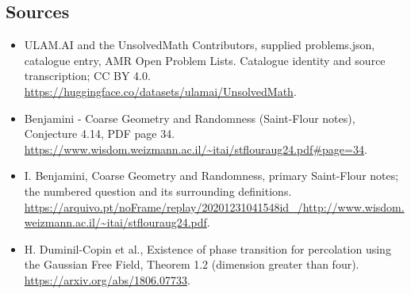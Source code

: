 \documentclass[11pt,a4paper]{article}
\begin{document}
\subsection{Sources}
\begin{itemize}
\item[S1] ULAM.AI and the UnsolvedMath Contributors, supplied problems.json, catalogue entry, AMR Open Problem Lists. Catalogue identity and source transcription; CC BY 4.0.
\url{https://huggingface.co/datasets/ulamai/UnsolvedMath}.
\item[S2] Benjamini - Coarse Geometry and Randomness (Saint-Flour notes), Conjecture 4.14, PDF page 34. 
\url{https://www.wisdom.weizmann.ac.il/~itai/stflouraug24.pdf#page=34}.
\item[S3] I. Benjamini, Coarse Geometry and Randomness, primary Saint-Flour notes; the numbered question and its surrounding definitions.
\url{https://arquivo.pt/noFrame/replay/20201231041548id_/http://www.wisdom.weizmann.ac.il/~itai/stflouraug24.pdf}.
\item[S4] H. Duminil-Copin et al., Existence of phase transition for percolation using the Gaussian Free Field, Theorem 1.2 (dimension greater than four).
\url{https://arxiv.org/abs/1806.07733}.
\end{itemize}
\end{document}

